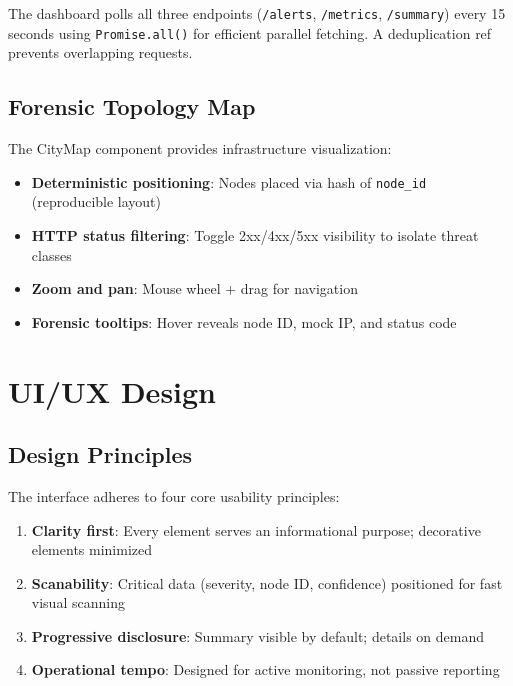 \documentclass[12pt,a4paper]{article}
\begin{document}
The dashboard polls all three endpoints (\texttt{/alerts}, \texttt{/metrics}, \texttt{/summary}) every 15 seconds using \texttt{Promise.all()} for efficient parallel fetching. A deduplication ref prevents overlapping requests.

\subsection{Forensic Topology Map}

The CityMap component provides infrastructure visualization:

\begin{itemize}[noitemsep]
    \item \textbf{Deterministic positioning}: Nodes placed via hash of \texttt{node\_id} (reproducible layout)
    \item \textbf{HTTP status filtering}: Toggle 2xx/4xx/5xx visibility to isolate threat classes
    \item \textbf{Zoom and pan}: Mouse wheel + drag for navigation
    \item \textbf{Forensic tooltips}: Hover reveals node ID, mock IP, and status code
\end{itemize}

\section{UI/UX Design}

\subsection{Design Principles}

The interface adheres to four core usability principles:

\begin{enumerate}[noitemsep]
    \item \textbf{Clarity first}: Every element serves an informational purpose; decorative elements minimized
    \item \textbf{Scanability}: Critical data (severity, node ID, confidence) positioned for fast visual scanning
    \item \textbf{Progressive disclosure}: Summary visible by default; details on demand
    \item \textbf{Operational tempo}: Designed for active monitoring, not passive reporting
\end{enumerate}
\end{document}
